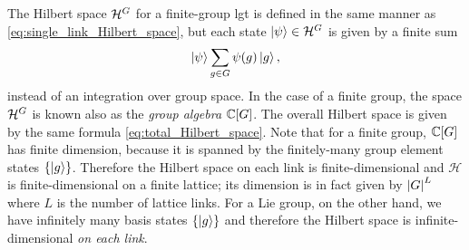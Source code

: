 The Hilbert space $\mathcal{H}^{G}$ for a finite-group \ac{lgt} is defined in the same manner as \eqref{eq:single_link_Hilbert_space}, but each state $\ket{\psi} \in \mathcal{H}^{G}$ is given by a finite sum
\begin{equation}
    \ket{\psi} \sum_{g \in G} \psi(g) \ket{g},
\end{equation}
instead of an integration over group space.
In the case of a finite group, the space $\mathcal{H}^{G}$ is known also as the \emph{group algebra} $\mathbb{C}[G]$.
The overall Hilbert space is given by the same formula \eqref{eq:total_Hilbert_space}.
Note that for a finite group, $\mathbb{C}[G]$ has finite dimension, because it is spanned by the finitely-many group element states $\{\ket{g}\}$.
Therefore the Hilbert space on each link is finite-dimensional and $\mathcal{H}$ is finite-dimensional on a finite lattice; its dimension is in fact given by $\abs{G}^L$ where $L$ is the number of lattice links.
For a Lie group, on the other hand, we have infinitely many basis states $\{\ket{g}\}$ and therefore the Hilbert space is infinite-dimensional \emph{on each link}.

